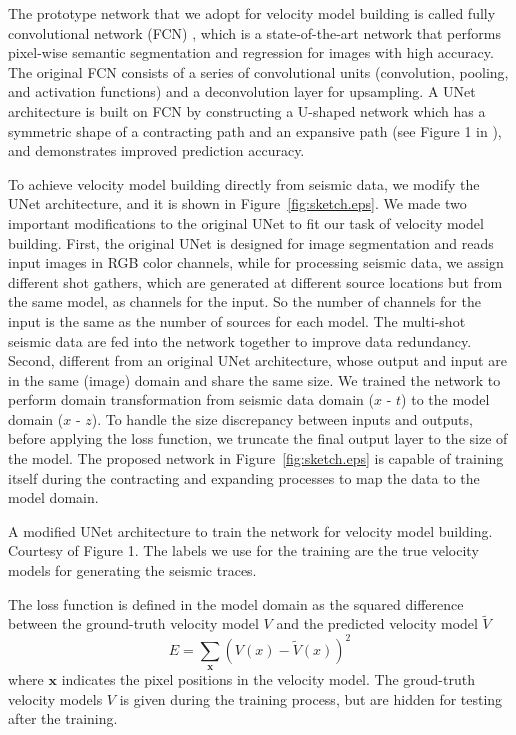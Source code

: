 \documentclass{segabs}
\begin{document}
The prototype network that we adopt for velocity model building is called fully convolutional network (FCN) \citep{long15}, which is a state-of-the-art network that performs pixel-wise semantic segmentation and regression for images with high accuracy. The original FCN consists of a series of convolutional units (convolution, pooling, and activation functions) and a deconvolution layer for upsampling. A UNet architecture \citep{ronneberger15} is built on FCN by constructing a U-shaped network which has a symmetric shape of a contracting path and an expansive path (see Figure 1 in \citet{ronneberger15}), and demonstrates improved prediction accuracy. 

To achieve velocity model building directly from seismic data, we modify the UNet architecture, and it is shown in Figure~\ref{fig:sketch.eps}.
We made two important modifications to the original UNet to fit our task of velocity model building. 
First, the original UNet is designed for image segmentation and reads input images in RGB color channels, while for processing seismic data, we assign different shot gathers, which are generated at different source locations but from the same model, as channels for the input. So the number of channels for the input is the same as the number of sources for each model. The multi-shot seismic data are fed into the network together to improve data redundancy. Second, different from an original UNet architecture, whose output and input are in the same (image) domain and share the same size. We trained the network to perform domain transformation from seismic data domain ($x$ - $t$) to the model domain ($x$ - $z$). To handle the size discrepancy between inputs and outputs, before applying the loss function, we truncate the final output layer to the size of the model. The proposed network in Figure~\ref{fig:sketch.eps} is capable of training itself during the contracting and expanding processes to map the data to the model domain.

{A modified UNet architecture to train the network for velocity model building. Courtesy of \citet{ronneberger15} Figure 1.}
The labels we use for the training are the true velocity models for generating the seismic traces.

The loss function is defined in the model domain as the squared difference between the ground-truth velocity model $V$ and the predicted velocity model $\tilde{V}$
\begin{equation}
E = \sum_{\boldsymbol{x}} (V(x)-\tilde{V}(x))^2
\label{loss}
\end{equation}
where $\boldsymbol{x}$ indicates the pixel positions in the velocity model. The groud-truth velocity models $V$ is given during the training process, but are hidden for testing after the training.
\end{document}
